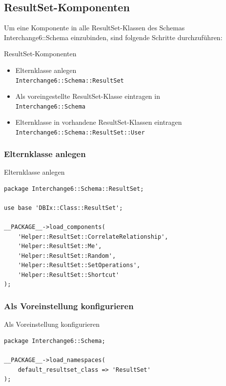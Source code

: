 \subsection{ResultSet-Komponenten}

Um eine Komponente in alle ResultSet-Klassen des Schemas
Interchange6::Schema einzubinden, sind folgende
Schritte durchzuführen:

\begin{frame}[fragile]{ResultSet-Komponenten}
\begin{itemize}
\item Elternklasse anlegen \\
  \verb|Interchange6::Schema::ResultSet|
\item Als voreingestellte ResultSet-Klasse eintragen in \\
  \verb|Interchange6::Schema|
\item Elternklasse in vorhandene ResultSet-Klassen eintragen \\
 \verb|Interchange6::Schema::ResultSet::User|
\end{itemize}
\end{frame}

\subsubsection{Elternklasse anlegen}

\begin{frame}[fragile]{Elternklasse anlegen}
\begin{lstlisting}
package Interchange6::Schema::ResultSet;

use base 'DBIx::Class::ResultSet';

__PACKAGE__->load_components(
    'Helper::ResultSet::CorrelateRelationship',
    'Helper::ResultSet::Me',
    'Helper::ResultSet::Random',
    'Helper::ResultSet::SetOperations',
    'Helper::ResultSet::Shortcut'
);

\end{lstlisting}
\end{frame}

\subsubsection{Als Voreinstellung konfigurieren}

\begin{frame}[fragile]{Als Voreinstellung konfigurieren}
\begin{lstlisting}
package Interchange6::Schema;

__PACKAGE__->load_namespaces(
    default_resultset_class => 'ResultSet'
);

\end{lstlisting}
\end{frame}

